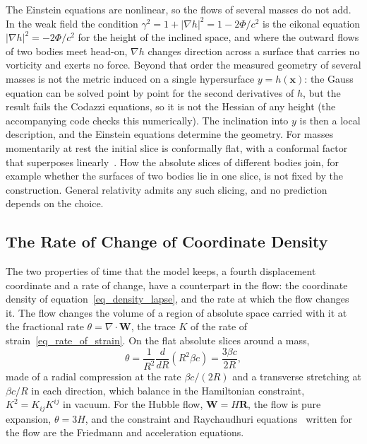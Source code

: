 \documentclass{iopjournal}
\begin{document}
The Einstein equations are nonlinear, so the flows of several masses do not add. In the weak field the condition $\gamma^2=1+|\nabla h|^2=1-2\Phi/c^2$ is the eikonal equation $|\nabla h|^2=-2\Phi/c^2$ for the height of the inclined space, and where the outward flows of two bodies meet head-on, $\nabla h$ changes direction across a surface that carries no vorticity and exerts no force. Beyond that order the measured geometry of several masses is not the metric induced on a single hypersurface $y=h(\mathbf{x})$: the Gauss equation can be solved point by point for the second derivatives of $h$, but the result fails the Codazzi equations, so it is not the Hessian of any height (the accompanying code checks this numerically). The inclination into $y$ is then a local description, and the Einstein equations determine the geometry. For masses momentarily at rest the initial slice is conformally flat, with a conformal factor that superposes linearly~\cite{BrillLindquist1963}. How the absolute slices of different bodies join, for example whether the surfaces of two bodies lie in one slice, is not fixed by the construction. General relativity admits any such slicing, and no prediction depends on the choice.

\subsection{The Rate of Change of Coordinate Density}\label{sec_coordinate_density}

The two properties of time that the model keeps, a fourth displacement coordinate and a rate of change, have a counterpart in the flow: the coordinate density of equation~\eqref{eq_density_lapse}, and the rate at which the flow changes it. The flow changes the volume of a region of absolute space carried with it at the fractional rate $\theta=\nabla\cdot\mathbf{W}$, the trace $K$ of the rate of strain~\eqref{eq_rate_of_strain}. On the flat absolute slices around a mass,
\begin{equation}\label{eq_theta_mass}
    \theta=\frac{1}{R^2}\frac{d}{dR}\left(R^2\beta c\right)=\frac{3\beta c}{2R} ,
\end{equation}
made of a radial compression at the rate $\beta c/(2R)$ and a transverse stretching at $\beta c/R$ in each direction, which balance in the Hamiltonian constraint, $K^2=K_{ij}K^{ij}$ in vacuum. For the Hubble flow, $\mathbf{W}=H\mathbf{R}$, the flow is pure expansion, $\theta=3H$, and the constraint and Raychaudhuri equations~\cite{Raychaudhuri1955} written for the flow are the Friedmann and acceleration equations.
\end{document}
